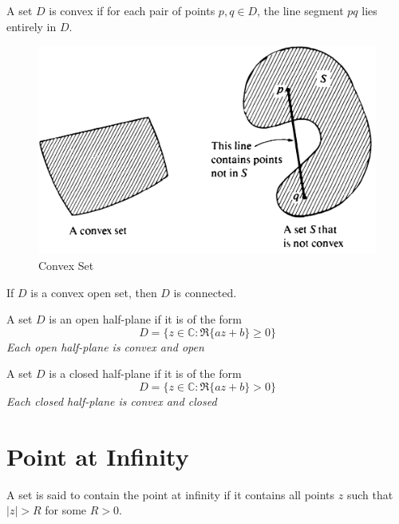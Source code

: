 \begin{definition}
    A set $D$ is convex if for each pair of points $p, q \in D$, the line segment $pq$ lies entirely in $D$.
\end{definition}

\begin{figure}[H]
    \centering
    \includegraphics[scale=0.5]{LECTURE_2/convex.png}
    \caption{Convex Set}
    \label{fig:convex}
\end{figure}

\begin{theorem}
    If $D$ is a convex open set, then $D$ is connected.
\end{theorem}

\begin{definition}
    A set $D$ is an open half-plane if it is of the form
    \[
        D = \{z \in \mathbb{C} : \Re\{az + b\} \geq 0\}
    \]
    \textit{Each open half-plane is convex and open}
\end{definition}

\begin{definition}
    A set $D$ is a closed half-plane if it is of the form
    \[
        D = \{z \in \mathbb{C} : \Re\{az + b\} > 0\}
    \]
    \textit{Each closed half-plane is convex and closed}
\end{definition}

\section{Point at Infinity}
\begin{definition}
    A set is said to contain the point at infinity if it contains all points $z$ such that $|z| > R$ for some $R > 0$.
\end{definition}

